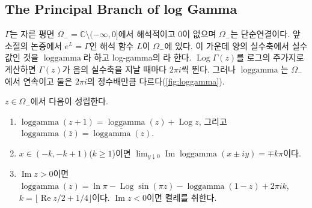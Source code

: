 \subsection{The Principal Branch of log Gamma}
\label{sec:loggamma-branch}

$\Gamma$는 자른 평면 $\Omega_-=\mathbb{C}\setminus(-\infty,0]$에서 해석적이고 $0$이 없으며 $\Omega_-$는 단순연결이다. 앞 소절의 논증에서 $e^{L}=\Gamma$인 해석 함수 $L$이 $\Omega_-$에 있다. 이 가운데 양의 실수축에서 실수값인 것을 $\operatorname{loggamma}$라 하고 log-gamma의 라 한다\cite{hare1997loggamma}. $\operatorname{Log}\Gamma(z)$를 로그의 주가지로 계산하면 $\Gamma(z)$가 음의 실수축을 지날 때마다 $2\pi i$씩 뛴다. 그러나 $\operatorname{loggamma}$는 $\Omega_-$에서 연속이고 둘은 $2\pi i$의 정수배만큼 다르다(\cref{fig:loggamma}).

\begin{proposition}
\label{prop:loggamma}
$z\in\Omega_-$에서 다음이 성립한다.
\begin{enumerate}
\item $\operatorname{loggamma}(z+1)=\operatorname{loggamma}(z)+\operatorname{Log}z$, 그리고 $\operatorname{loggamma}(\bar z)=\overline{\operatorname{loggamma}(z)}$.
\item $x\in(-k,-k+1)$($k\ge1$)이면 $\lim_{y\downarrow0}\operatorname{Im}\operatorname{loggamma}(x\pm iy)=\mp k\pi$이다.
\item $\operatorname{Im}z>0$이면 $\operatorname{loggamma}(z)=\ln\pi-\operatorname{Log}\sin(\pi z)-\operatorname{loggamma}(1-z)+2\pi ik$, $k=\lfloor\operatorname{Re}z/2+1/4\rfloor$이다. $\operatorname{Im}z<0$이면 켤레를 취한다.
\end{enumerate}
\end{proposition}

